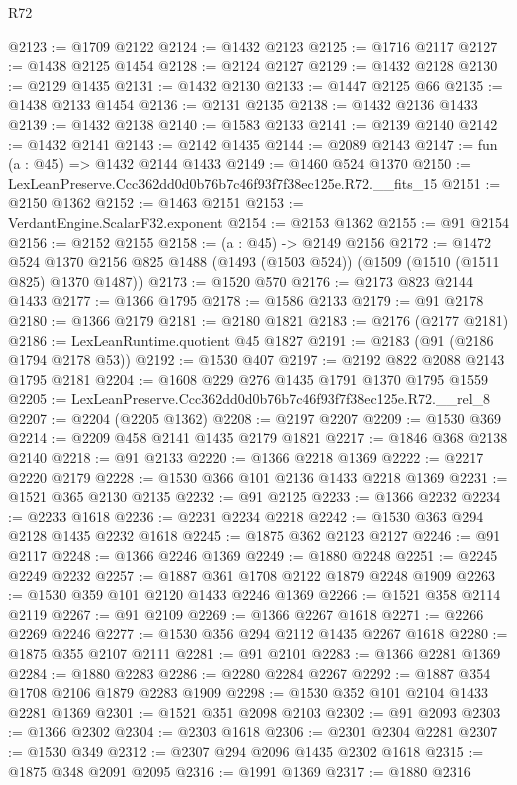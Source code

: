 \begin{lexlean}{R72}
\begin{coremodule}
@2123 := @1709 @2122
@2124 := @1432 @2123
@2125 := @1716 @2117
@2127 := @1438 @2125 @1454
@2128 := @2124 @2127
@2129 := @1432 @2128
@2130 := @2129 @1435
@2131 := @1432 @2130
@2133 := @1447 @2125 @66
@2135 := @1438 @2133 @1454
@2136 := @2131 @2135
@2138 := @1432 @2136 @1433
@2139 := @1432 @2138
@2140 := @1583 @2133
@2141 := @2139 @2140
@2142 := @1432 @2141
@2143 := @2142 @1435
@2144 := @2089 @2143
@2147 := fun (a : @45) => @1432 @2144 @1433
@2149 := @1460 @524 @1370
@2150 := LexLeanPreserve.Ccc362dd0d0b76b7c46f93f7f38ec125e.R72.__fits_15
@2151 := @2150 @1362
@2152 := @1463 @2151
@2153 := VerdantEngine.ScalarF32.exponent
@2154 := @2153 @1362
@2155 := @91 @2154
@2156 := @2152 @2155
@2158 := (a : @45) -> @2149 @2156
@2172 := @1472
    @524
    @1370
    @2156
    @825
    @1488
    (@1493 (@1503 @524))
    (@1509 (@1510 (@1511 @825) @1370 @1487))
@2173 := @1520 @570
@2176 := @2173 @823 @2144 @1433
@2177 := @1366 @1795
@2178 := @1586 @2133
@2179 := @91 @2178
@2180 := @1366 @2179
@2181 := @2180 @1821
@2183 := @2176 (@2177 @2181)
@2186 := LexLeanRuntime.quotient @45 @1827
@2191 := @2183 (@91 (@2186 @1794 @2178 @53))
@2192 := @1530 @407
@2197 := @2192 @822 @2088 @2143 @1795 @2181
@2204 := @1608 @229 @276 @1435 @1791 @1370 @1795 @1559
@2205 := LexLeanPreserve.Ccc362dd0d0b76b7c46f93f7f38ec125e.R72.__rel_8
@2207 := @2204 (@2205 @1362)
@2208 := @2197 @2207
@2209 := @1530 @369
@2214 := @2209 @458 @2141 @1435 @2179 @1821
@2217 := @1846 @368 @2138 @2140
@2218 := @91 @2133
@2220 := @1366 @2218 @1369
@2222 := @2217 @2220 @2179
@2228 := @1530 @366 @101 @2136 @1433 @2218 @1369
@2231 := @1521 @365 @2130 @2135
@2232 := @91 @2125
@2233 := @1366 @2232
@2234 := @2233 @1618
@2236 := @2231 @2234 @2218
@2242 := @1530 @363 @294 @2128 @1435 @2232 @1618
@2245 := @1875 @362 @2123 @2127
@2246 := @91 @2117
@2248 := @1366 @2246 @1369
@2249 := @1880 @2248
@2251 := @2245 @2249 @2232
@2257 := @1887 @361 @1708 @2122 @1879 @2248 @1909
@2263 := @1530 @359 @101 @2120 @1433 @2246 @1369
@2266 := @1521 @358 @2114 @2119
@2267 := @91 @2109
@2269 := @1366 @2267 @1618
@2271 := @2266 @2269 @2246
@2277 := @1530 @356 @294 @2112 @1435 @2267 @1618
@2280 := @1875 @355 @2107 @2111
@2281 := @91 @2101
@2283 := @1366 @2281 @1369
@2284 := @1880 @2283
@2286 := @2280 @2284 @2267
@2292 := @1887 @354 @1708 @2106 @1879 @2283 @1909
@2298 := @1530 @352 @101 @2104 @1433 @2281 @1369
@2301 := @1521 @351 @2098 @2103
@2302 := @91 @2093
@2303 := @1366 @2302
@2304 := @2303 @1618
@2306 := @2301 @2304 @2281
@2307 := @1530 @349
@2312 := @2307 @294 @2096 @1435 @2302 @1618
@2315 := @1875 @348 @2091 @2095
@2316 := @1991 @1369
@2317 := @1880 @2316

\end{coremodule}
\end{lexlean}
